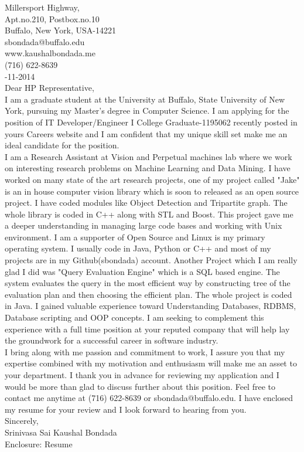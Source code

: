 \documentclass[10pt,letterpaper,oneside]{article}
\begin{document}
 Millersport Highway,\\
Apt.no.210, Postbox.no.10\\
Buffalo, New York, USA-14221\\
sbondada@buffalo.edu\\
www.kaushalbondada.me\\
(716) 622-8639\\

-11-2014\\
 
\noindent Dear HP Representative,\\
 
I am a graduate student at the University at Buffalo, State University of New York, pursuing my
Master's degree in Computer Science. I am applying for the position of IT Developer/Engineer I College
Graduate-1195062 recently posted in yours Careers website and I am confident that my unique skill set make me an ideal candidate for the position.\\

I am a Research Assistant at Vision and Perpetual machines lab where we work on interesting research problems on
Machine Learning and Data Mining. I have worked on many state of the art research projects, one of my
project called "Jake" is an in house computer vision library which is soon to released as an
open source project. I have coded modules like Object Detection and Tripartite graph. The whole library
is coded in C++ along with STL and Boost. This project gave me a deeper understanding in managing large
code bases and working with Unix environment. I am a supporter of Open Source and 
Linux is my primary operating system. I usually code in Java, Python or C++ and most of my projects are
in my Github(sbondada) account. Another Project which I am really glad I did was "Query Evaluation
Engine" which is a SQL based engine. The system evaluates the query in the most efficient way by constructing tree
of the evaluation plan and then choosing the efficient plan. The whole project is coded in Java.   
I gained valuable experience toward Understanding Databases, RDBMS, Database scripting and OOP concepts. I am seeking to complement this experience with a full time position at your reputed company that will help lay the groundwork for a successful career in software industry.\\

I bring along with me passion and commitment to work, I assure you that my expertise combined with my motivation
and enthusiasm will make me an asset to your department. I thank you in advance for reviewing my application and I would be more than glad to
discuss further about this position. Feel free to contact me anytime at (716) 622-8639 or sbondada@buffalo.edu. I have enclosed my resume for your review and I look forward to hearing from you.\\
 
\noindent Sincerely,\\
Srinivasa Sai Kaushal Bondada\\
Enclosure: Resume\\
\end{document}
